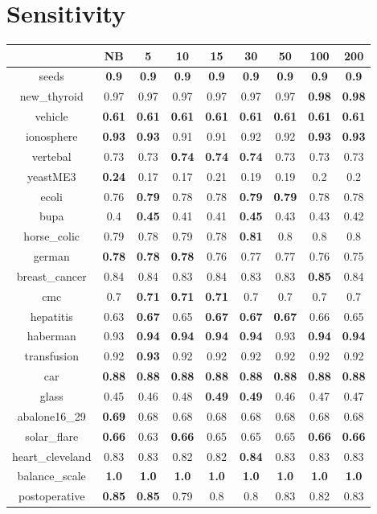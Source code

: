 \documentclass{article}%
\begin{document}
%
\section*{Sensitivity}%
\begin{tabular}{c|cccccccc}%
\hline%
&NB&5&10&15&30&50&100&200\\%
\hline%
seeds&\textbf{0.9}&\textbf{0.9}&\textbf{0.9}&\textbf{0.9}&\textbf{0.9}&\textbf{0.9}&\textbf{0.9}&\textbf{0.9}\\%
new\_thyroid&0.97&0.97&0.97&0.97&0.97&0.97&\textbf{0.98}&\textbf{0.98}\\%
vehicle&\textbf{0.61}&\textbf{0.61}&\textbf{0.61}&\textbf{0.61}&\textbf{0.61}&\textbf{0.61}&\textbf{0.61}&\textbf{0.61}\\%
ionosphere&\textbf{0.93}&\textbf{0.93}&0.91&0.91&0.92&0.92&\textbf{0.93}&\textbf{0.93}\\%
vertebal&0.73&0.73&\textbf{0.74}&\textbf{0.74}&\textbf{0.74}&0.73&0.73&0.73\\%
yeastME3&\textbf{0.24}&0.17&0.17&0.21&0.19&0.19&0.2&0.2\\%
ecoli&0.76&\textbf{0.79}&0.78&0.78&\textbf{0.79}&\textbf{0.79}&0.78&0.78\\%
bupa&0.4&\textbf{0.45}&0.41&0.41&\textbf{0.45}&0.43&0.43&0.42\\%
horse\_colic&0.79&0.78&0.79&0.78&\textbf{0.81}&0.8&0.8&0.8\\%
german&\textbf{0.78}&\textbf{0.78}&\textbf{0.78}&0.76&0.77&0.77&0.76&0.75\\%
breast\_cancer&0.84&0.84&0.83&0.84&0.83&0.83&\textbf{0.85}&0.84\\%
cmc&0.7&\textbf{0.71}&\textbf{0.71}&\textbf{0.71}&0.7&0.7&0.7&0.7\\%
hepatitis&0.63&\textbf{0.67}&0.65&\textbf{0.67}&\textbf{0.67}&\textbf{0.67}&0.66&0.65\\%
haberman&0.93&\textbf{0.94}&\textbf{0.94}&\textbf{0.94}&\textbf{0.94}&0.93&\textbf{0.94}&\textbf{0.94}\\%
transfusion&0.92&\textbf{0.93}&0.92&0.92&0.92&0.92&0.92&0.92\\%
car&\textbf{0.88}&\textbf{0.88}&\textbf{0.88}&\textbf{0.88}&\textbf{0.88}&\textbf{0.88}&\textbf{0.88}&\textbf{0.88}\\%
glass&0.45&0.46&0.48&\textbf{0.49}&\textbf{0.49}&0.46&0.47&0.47\\%
abalone16\_29&\textbf{0.69}&0.68&0.68&0.68&0.68&0.68&0.68&0.68\\%
solar\_flare&\textbf{0.66}&0.63&\textbf{0.66}&0.65&0.65&0.65&\textbf{0.66}&\textbf{0.66}\\%
heart\_cleveland&0.83&0.83&0.82&0.82&\textbf{0.84}&0.83&0.83&0.83\\%
balance\_scale&\textbf{1.0}&\textbf{1.0}&\textbf{1.0}&\textbf{1.0}&\textbf{1.0}&\textbf{1.0}&\textbf{1.0}&\textbf{1.0}\\%
postoperative&\textbf{0.85}&\textbf{0.85}&0.79&0.8&0.8&0.83&0.82&0.83\\%
\end{tabular}
\end{document}
